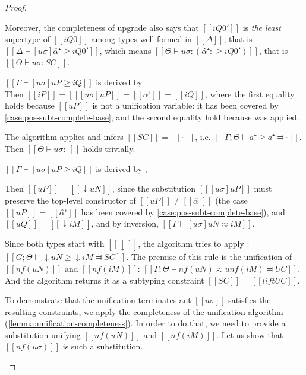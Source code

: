 \begin{proof}
\begin{caseof}
            Moreover, the completeness of upgrade also says that $[[iQ0']]$ is 
            \emph{the least} supertype of $[[iQ0]]$ among types well-formed in $[[Δ]]$, 
            that is $[[Δ ⊢ [uσ]α̂⁺ ≥ iQ0']]$, which means 
            $[[Θ ⊢ uσ : (α̂⁺ :≥ iQ0')]]$, that is $[[Θ ⊢ uσ : SC]]$.

        \item \label{case:pos-subt-complete-pvar}
        $[[ Γ ⊢ [uσ]uP ≥ iQ ]]$ is derived by \\
        Then $[[iP]] = [[ [uσ]uP ]] = [[ α⁺ ]] = [[iQ]]$, where
        the first equality holds because $[[uP]]$ is not a unification variable:
        it has been covered by \cref{case:pos-subt-complete-base}; and
        the second equality hold because  was applied.

        The algorithm applies  and 
        infers $[[SC]] = [[·]]$, i.e. $[[Γ;Θ ⊨ a⁺ ≥ a⁺ ⫤ ·]]$.
        Then $[[Θ ⊢ uσ : ·]]$ holds trivially.


        \item \label{case:pos-subt-complete-upshift} $[[ Γ ⊢ [uσ]uP ≥ iQ ]]$ 
        is derived by ,
        
        Then $[[ uP ]] = [[ ↓uN ]]$, since the substitution $[[ [uσ]uP ]]$ must preserve the 
        top-level constructor of $[[uP]]\neq [[α̂⁺]]$ (the case $[[uP]] = [[α̂⁺]]$ has been covered
        by \cref{case:pos-subt-complete-base}), and $[[uQ]] = [[ ↓iM ]]$,
        and by inversion, $[[ Γ ⊢ [uσ]uN ≈ iM ]]$.

        Since both types start with $[[↓]]$, 
        the algorithm tries to apply : 
        $[[G;Θ ⊨ ↓uN ≥ ↓iM ⫤ SC]]$. The premise of this rule is the
        unification of $[[nf(uN)]]$ and $[[nf(iM)]]$:
        $[[Γ;Θ ⊨ nf(uN) ≈u nf(iM) ⫤ UC]]$. And the algorithm 
        returns it as a subtyping constraint $[[SC]] = [[lift UC]]$.


        To demonstrate that the unification terminates
        ant $[[uσ]]$ satisfies the resulting constraints, 
        we apply the completeness 
        of the unification algorithm (\cref{lemma:unification-completeness}). 
        In order to do that, we need to provide a substitution unifying  
        $[[nf(uN)]]$ and $[[nf(iM)]]$. 
        Let us show that $[[nf(uσ)]]$ is such a substitution. 


\end{caseof}
\end{proof}
